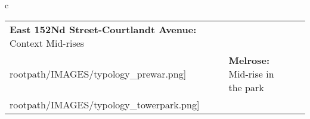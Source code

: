 \begin{table}[H]
        \begin{tabular}{c}
        \begin{tabular}{m{1.25in} m{2in} m{.1in} m{1.25in} m{2in}}
\textbf{East 152Nd Street-Courtlandt Avenue:} {Context Mid-rises} & \texttt{[image: \\rootpath/IMAGES/typology\_prewar.png]} & & \textbf{Melrose:} {Mid-rise in the park} & \texttt{[image: \\rootpath/IMAGES/typology\_towerpark.png]}
\end{tabular}\end{tabular}
        \end{table}